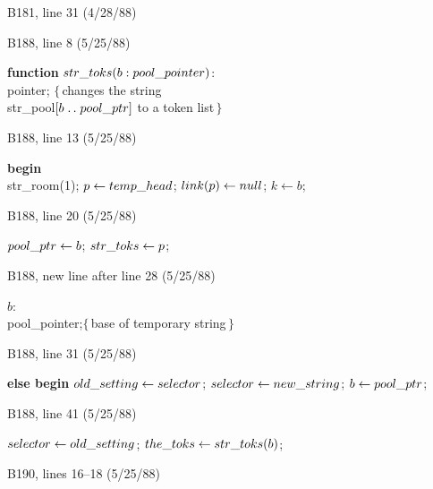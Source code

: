 \bugonpage B181, line 31 (4/28/88)

\ninepoint{}

\bugonpage B188, line 8 (5/25/88)

\ninepoint\noindent
{\bf function} $\\{str\_toks}(b:\\{pool\_pointer})$: \\{pointer};\quad
 $\{\,$changes the string \\{str\_pool}$[b\to\\{pool\_ptr}]$ to a token list$\,\}$

\bugonpage B188, line 13 (5/25/88)

\ninepoint\noindent\kern10pt
{\bf begin} \\{str\_room}(1); $p\gets\\{temp\_head}$;
 $\\{link}(p)\gets\\{null}$; $k\gets b$;

\bugonpage B188, line 20 (5/25/88)

\ninepoint\noindent\kern10pt
$\\{pool\_ptr}\gets b$; $\\{str\_toks}\gets p$;

\bugonpage B188, new line after line 28 (5/25/88)

\ninepoint\noindent\kern20pt
$b$: \\{pool\_pointer};\quad$\{\,$base of temporary string$\,\}$

\bugonpage B188, line 31 (5/25/88)

\ninepoint\noindent\kern10pt
{\bf else begin} $\\{old\_setting}\gets\\{selector}$;
 $\\{selector}\gets\\{new\_string}$; $b\gets\\{pool\_ptr}$;

\bugonpage B188, line 41 (5/25/88)

\ninepoint\noindent\kern20pt
$\\{selector}\gets\\{old\_setting}$; $\\{the\_toks}\gets\\{str\_toks}(b)$;

\bugonpage B190, lines 16--18 (5/25/88)

